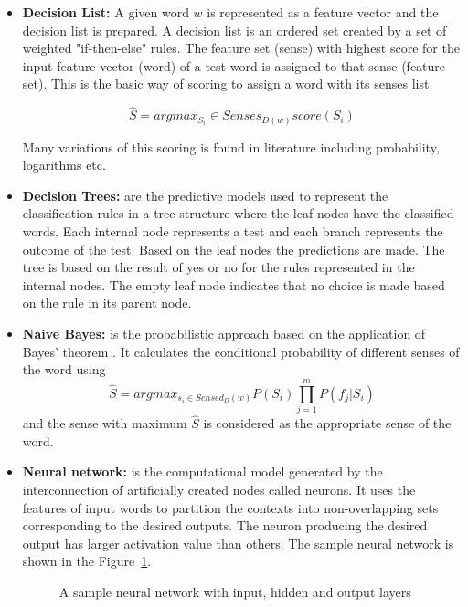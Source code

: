 \documentclass{bmcart}
\def\texttt{[image: ]}
\begin{document}
\begin{itemize}
\item {\bf Decision List: } A given word $w$ is represented as a feature vector and the 	decision list is prepared. A decision list is an ordered set created by a set of weighted "if-then-else" rules. The feature set (sense) with highest score for the input feature vector (word) of a test word is assigned to that sense (feature set). This is the basic way of scoring to assign a word with its senses list.
\begin{center}
\vspace{-0.5cm}
\begin{equation}
\hat{S}=argmax_{S_i} \in Senses_{D(w)}score(S_i)
\end{equation}
\end{center}
Many variations of this scoring is found in literature including probability, logarithms etc. 

\item {\bf Decision Trees: }are the predictive models used to represent the classification rules in a tree structure where the leaf nodes have the classified words. Each internal node represents
a test and each branch represents the outcome of the test. Based on the leaf nodes the predictions are made. The tree is based on the result of yes or no for the rules represented in the internal nodes. The empty leaf node indicates that no choice is made based on the rule in its parent node. 

\item{\bf Naive Bayes:} is the probabilistic approach based on the application of Bayes' theorem \cite{bayesClassifier}. It calculates the conditional probability of different senses of the word using
\begin{equation}
\hat{S}=argmax_{s_i \in Sensed_{D}(w)} P(S_i) \prod_{j=1}^{m}P(f_j|S_i)
\end{equation}
and the sense with maximum $\hat{S}$ is considered as the appropriate sense of the word.

\item {\bf Neural network:} is the computational model generated by the interconnection of artificially created nodes called neurons. It uses the features of input words to partition the contexts into non-overlapping sets corresponding to the desired outputs. The neuron producing the desired output has larger activation value than others. The sample neural network is shown in the Figure~\ref{fig:neuralNetwork}.
\begin{figure}[h!tb]
\centering
{}
\caption{A sample neural network with input, hidden and output layers}
\label{fig:neuralNetwork}
\end{figure}


\end{itemize}
\end{document}
